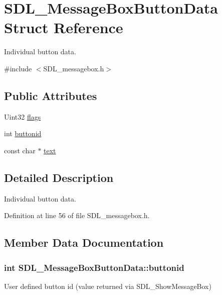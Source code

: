 \hypertarget{structSDL__MessageBoxButtonData}{\section{S\+D\+L\+\_\+\+Message\+Box\+Button\+Data Struct Reference}
\label{structSDL__MessageBoxButtonData}
}


Individual button data.  




{\ttfamily \#include $<$S\+D\+L\+\_\+messagebox.\+h$>$}

\subsection*{Public Attributes}
\begin{DoxyCompactItemize}
\item 
Uint32 \hyperlink{structSDL__MessageBoxButtonData_a426c8b5da0e718242c7840706d95de0b}{flags}
\item 
int \hyperlink{structSDL__MessageBoxButtonData_a22938886a6b13792006cc5c91fa38e92}{buttonid}
\item 
const char $\ast$ \hyperlink{structSDL__MessageBoxButtonData_a68776c143a233a93092f7707c843c438}{text}
\end{DoxyCompactItemize}


\subsection{Detailed Description}
Individual button data. 

Definition at line 56 of file S\+D\+L\+\_\+messagebox.\+h.



\subsection{Member Data Documentation}
\hypertarget{structSDL__MessageBoxButtonData_a22938886a6b13792006cc5c91fa38e92}{
\subsubsection[{buttonid}]{\setlength{\rightskip}{0pt plus 5cm}int S\+D\+L\+\_\+\+Message\+Box\+Button\+Data\+::buttonid}}\label{structSDL__MessageBoxButtonData_a22938886a6b13792006cc5c91fa38e92}
User defined button id (value returned via S\+D\+L\+\_\+\+Show\+Message\+Box) 

